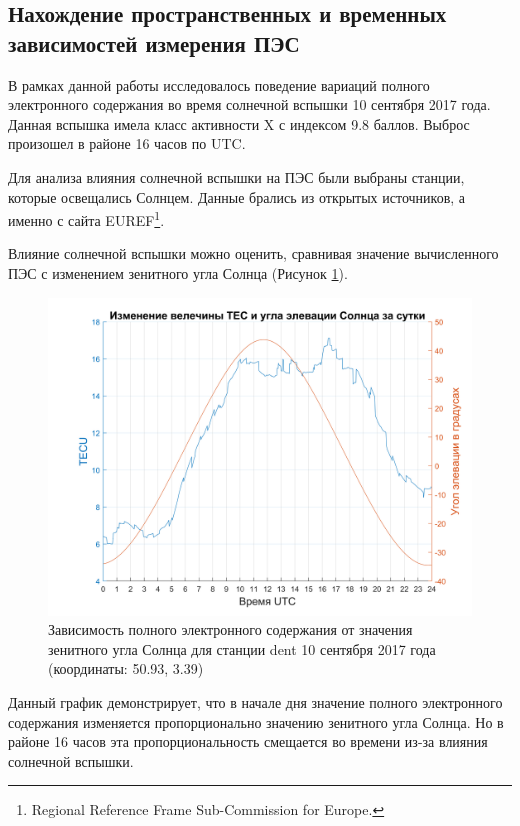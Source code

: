 \documentclass[a4paper]{article}
\begin{document}
\clearpage
\newpage
\subsection{Нахождение пространственных и временных зависимостей измерения ПЭС}
В рамках данной работы исследовалось поведение вариаций полного электронного содержания во время солнечной вспышки 10 сентября 2017 года. Данная вспышка имела класс активности X с индексом 9.8 баллов. Выброс произошел в районе 16 часов по UTC.

Для анализа влияния солнечной вспышки на ПЭС были выбраны станции, которые освещались Солнцем. Данные брались из открытых источников, а именно с сайта EUREF\footnote{Regional Reference Frame Sub-Commission for Europe.}.

Влияние солнечной вспышки можно оценить, сравнивая значение вычисленного ПЭС с изменением зенитного угла Солнца (Рисунок \ref{tecsun}). 

\begin{figure}[h]
\centering
\includegraphics[width = 1\linewidth]{pics/clean_pics/tec_sun.png}
\caption{Зависимость полного электронного содержания от значения зенитного угла Солнца  для станции dent 10 сентября 2017 года (координаты: 50.93, 3.39)}
\label{tecsun}
\end{figure} 

Данный график демонстрирует, что в начале дня значение полного электронного содержания изменяется пропорционально значению зенитного угла Солнца. Но в районе 16 часов эта пропорциональность смещается во времени из-за влияния солнечной вспышки. 
\end{document}
